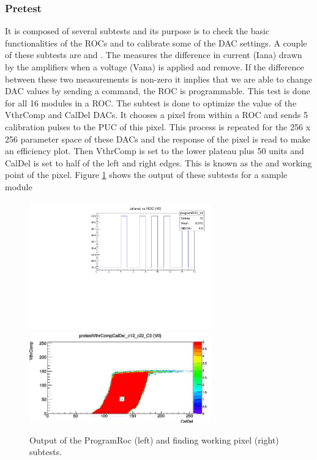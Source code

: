 \subsubsection{Pretest}
It is composed of several subtests and its purpose is to check the basic functionalities of the ROCs and to calibrate some of the DAC {} settings. A couple of these subtests are  and . The  measures the difference in current (Iana) drawn by the amplifiers when a voltage (Vana) is applied and remove. 
If the difference between these two measurements is non-zero it implies that we are able to change DAC values by sending a command, the ROC is programmable. This test is done for all 16 modules in a ROC. The  subtest is done to optimize the value of the VthrComp and CalDel DACs. It chooses a pixel from within a ROC and sends 5 calibration pulses to the PUC of this pixel. This process is repeated for the 256 x 256 parameter space of these DACs and the response of the pixel is read to make an efficiency plot. Then VthrComp is set to the lower plateau plus 50 units and CalDel is set to half of the left and right edges. This is known as the  and  working point of the pixel. Figure \ref{fig:pretest} shows the output of these subtests for a sample module

\begin{figure}[!h]
  \centering
  \includegraphics[width=0.7\textwidth]{../images/ch7/pro_roc}
  \includegraphics[width=0.7\textwidth]{../images/ch7/working_point}
  \caption[Programable ROC and working point]{Output of the ProgramRoc (left) and finding working pixel (right) subtests.}\label{fig:pretest}
\end{figure}

